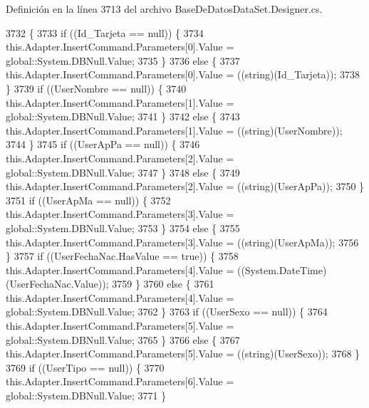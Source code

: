 Definición en la línea 3713 del archivo Base\-De\-Datos\-Data\-Set.\-Designer.\-cs.


\begin{DoxyCode}
3732                                                               \{
3733             \textcolor{keywordflow}{if} ((Id\_Tarjeta == null)) \{
3734                 this.Adapter.InsertCommand.Parameters[0].Value = global::System.DBNull.Value;
3735             \}
3736             \textcolor{keywordflow}{else} \{
3737                 this.Adapter.InsertCommand.Parameters[0].Value = ((string)(Id\_Tarjeta));
3738             \}
3739             \textcolor{keywordflow}{if} ((UserNombre == null)) \{
3740                 this.Adapter.InsertCommand.Parameters[1].Value = global::System.DBNull.Value;
3741             \}
3742             \textcolor{keywordflow}{else} \{
3743                 this.Adapter.InsertCommand.Parameters[1].Value = ((string)(UserNombre));
3744             \}
3745             \textcolor{keywordflow}{if} ((UserApPa == null)) \{
3746                 this.Adapter.InsertCommand.Parameters[2].Value = global::System.DBNull.Value;
3747             \}
3748             \textcolor{keywordflow}{else} \{
3749                 this.Adapter.InsertCommand.Parameters[2].Value = ((string)(UserApPa));
3750             \}
3751             \textcolor{keywordflow}{if} ((UserApMa == null)) \{
3752                 this.Adapter.InsertCommand.Parameters[3].Value = global::System.DBNull.Value;
3753             \}
3754             \textcolor{keywordflow}{else} \{
3755                 this.Adapter.InsertCommand.Parameters[3].Value = ((string)(UserApMa));
3756             \}
3757             \textcolor{keywordflow}{if} ((UserFechaNac.HasValue == \textcolor{keyword}{true})) \{
3758                 this.Adapter.InsertCommand.Parameters[4].Value = ((System.DateTime)(UserFechaNac.Value));
3759             \}
3760             \textcolor{keywordflow}{else} \{
3761                 this.Adapter.InsertCommand.Parameters[4].Value = global::System.DBNull.Value;
3762             \}
3763             \textcolor{keywordflow}{if} ((UserSexo == null)) \{
3764                 this.Adapter.InsertCommand.Parameters[5].Value = global::System.DBNull.Value;
3765             \}
3766             \textcolor{keywordflow}{else} \{
3767                 this.Adapter.InsertCommand.Parameters[5].Value = ((string)(UserSexo));
3768             \}
3769             \textcolor{keywordflow}{if} ((UserTipo == null)) \{
3770                 this.Adapter.InsertCommand.Parameters[6].Value = global::System.DBNull.Value;
3771             \}

\end{DoxyCode}
